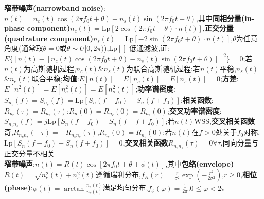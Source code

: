 \documentclass[UTF8,a4paper,10pt]{article}
\begin{document}
\begin{multicols}{2}
    \textbf{窄带噪声(narrowband noise)}:$n(t)=n_c(t)\cos(2\pi f_0t+\theta)-n_s(t)\sin(2\pi f_0t+\theta)$,其中\textbf{同相分量(in-phase component)}$n_c(t)=\text{Lp}[2\cos(2\pi f_0t+\theta)\cdot n(t)]$,\textbf{正交分量(quadrature component)}$n_s(t)=\text{Lp}[-2\sin(2\pi f_0t+\theta)\cdot n(t)]$,$\theta$为任意角度(通常取$\theta=0$或$\theta\sim U[0,2\pi)$),$\text{Lp}[]$-低通滤波,证:$E\{[n(t)-[n_c(t)\cos(2\pi f_0t+\theta)-n_s(t)\sin(2\pi f_0t+\theta)]]^2\}=0$;若$n(t)$为高斯随机过程,$n_c(t)$\&$n_s(t)$为联合高斯随机过程;若$n(t)$平稳,$n_s(t)$\&$n_c(t)$联合平稳;\textbf{均值}:$E[n(t)]=E[n_c(t)]=E[n_s(t)]=0$;\textbf{方差}:$E[n^2(t)]=E[n_c^2(t)]=E[n_s^2(t)]$;\textbf{功率谱密度}:$S_{n_c}(f)=S_{n_s}(f)=\text{Lp}[S_n(f-f_0)+S_n(f+f_0)]$;\textbf{相关函数}:$R_{n_c}(\tau)=R_{n_s}(\tau)$;$R_n(0)=R_{n_c}(0)=R_{n_s}(0)$;\textbf{交叉功率谱密度}:$S_{n_cn_s}(f)=j\text{Lp}[S_n(f-f_0)-S_n(f+f+f_0)]$;若$n(t)$WSS,\textbf{交叉相关函数}奇,$R_{n_cn_s}(-\tau)=-R_{n_cn_s}(\tau)$,$R_{n_s}(0)=R_{n_c}(0)$;若$n(t)$在$f>0$处关于$f_0$对称,$\text{Lp}[S_n(f-f_0)-S_n(f+f_0)]=0$,\textbf{交叉相关函数}$R_{n_cn_s}(\tau)=0\forall\tau$,同向分量与正交分量不相关\\
    \textbf{窄带噪声}:$n(t)=R(t)\cos[2\pi f_0t+\theta+\phi(t)]$,其中\textbf{包络(envelope)}$R(t)=\sqrt{n_c^2(t)+n_s^2(t)}$遵循瑞利分布,$f_R(r)=\frac{r}{\sigma^2}\exp(-\frac{r^2}{2\sigma^2})$,$r\geq 0$,\textbf{相位(phase)}:$\phi(t)=\arctan\frac{n_s(t)}{n_c(t)}$满足均匀分布,$f_{\phi}(\varphi)=\frac{1}{2\pi}$,$0\leq\varphi<2\pi$\\
\end{multicols}
\end{document}
